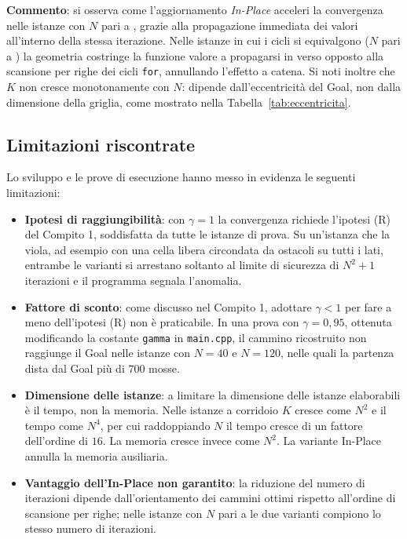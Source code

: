 \noindent
\textbf{Commento}: si osserva come l'aggiornamento \textit{In-Place} acceleri la convergenza nelle istanze con $N$ pari a \benchIstanzeKridotto{}, grazie alla propagazione immediata dei valori all'interno della stessa iterazione. Nelle istanze in cui i cicli si equivalgono ($N$ pari a \benchIstanzeKpari{}) la geometria costringe la funzione valore a propagarsi in verso opposto alla scansione per righe dei cicli \texttt{for}, annullando l'effetto a catena. Si noti inoltre che $K$ non cresce monotonamente con $N$: dipende dall'eccentricità del Goal, non dalla dimensione della griglia, come mostrato nella Tabella~\ref{tab:eccentricita}.

\clearpage
\subsection{Limitazioni riscontrate}
Lo sviluppo e le prove di esecuzione hanno messo in evidenza le seguenti limitazioni:

\begin{itemize}
    \item \textbf{Ipotesi di raggiungibilità}: con $\gamma = 1$ la convergenza richiede l'ipotesi (R) del Compito 1, soddisfatta da tutte le istanze di prova. Su un'istanza che la viola, ad esempio con una cella libera circondata da ostacoli su tutti i lati, entrambe le varianti si arrestano soltanto al limite di sicurezza di $N^2 + 1$ iterazioni e il programma segnala l'anomalia.

    \item \textbf{Fattore di sconto}: come discusso nel Compito 1, adottare $\gamma < 1$ per fare a meno dell'ipotesi (R) non è praticabile. In una prova con $\gamma = 0{,}95$, ottenuta modificando la costante \texttt{gamma} in \texttt{main.cpp}, il cammino ricostruito non raggiunge il Goal nelle istanze con $N = 40$ e $N = 120$, nelle quali la partenza dista dal Goal più di $700$ mosse.

    \item \textbf{Dimensione delle istanze}: a limitare la dimensione delle istanze elaborabili è il tempo, non la memoria. Nelle istanze a corridoio $K$ cresce come $N^2$ e il tempo come $N^4$, per cui raddoppiando $N$ il tempo cresce di un fattore dell'ordine di $16$. La memoria cresce invece come $N^2$. La variante In-Place annulla la memoria ausiliaria.

    \item \textbf{Vantaggio dell'In-Place non garantito}: la riduzione del numero di iterazioni dipende dall'orientamento dei cammini ottimi rispetto all'ordine di scansione per righe; nelle istanze con $N$ pari a \benchIstanzeKpari{} le due varianti compiono lo stesso numero di iterazioni.

\end{itemize}

